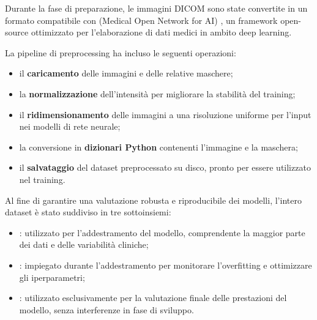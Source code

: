 
Durante la fase di preparazione, le immagini DICOM sono state convertite in un formato compatibile con  (Medical Open Network for AI) \cite{cardoso2022monai}, un framework open-source ottimizzato per l'elaborazione di dati medici in ambito deep learning.

La pipeline di preprocessing ha incluso le seguenti operazioni:
\begin{itemize}
\item il \textbf{caricamento} delle immagini e delle relative maschere;
\item la \textbf{normalizzazione} dell’intensità per migliorare la stabilità del training;
\item il \textbf{ridimensionamento} delle immagini a una risoluzione uniforme per l’input nei modelli di rete neurale;
\item la conversione in \textbf{dizionari Python} contenenti l'immagine e la maschera;
\item il \textbf{salvataggio} del dataset preprocessato su disco, pronto per essere utilizzato nel training.
\end{itemize}



Al fine di garantire una valutazione robusta e riproducibile dei modelli, l'intero dataset è stato suddiviso in tre sottoinsiemi:
\begin{itemize}
\item {}: utilizzato per l'addestramento del modello, comprendente la maggior parte dei dati e delle variabilità cliniche;
\item {}: impiegato durante l’addestramento per monitorare l’overfitting e ottimizzare gli iperparametri;
\item {}: utilizzato esclusivamente per la valutazione finale delle prestazioni del modello, senza interferenze in fase di sviluppo.
\end{itemize}

